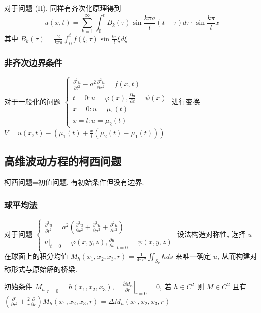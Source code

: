 \documentclass[10pt]{yerbaformat}
\begin{document}
\par 对于问题 (II), 同样有齐次化原理得到
$$
    u(x, t)=\sum_{k=1}^{\infty} \int_{0}^{t} B_{k}(\tau) \sin \frac{k \pi a}{l}(t-\tau) d \tau \cdot \sin \frac{k \pi}{l} x
$$
其中 $B_{k}(\tau)=\frac{2}{k \pi a} \int_{0}^{t} f(\xi, \tau) \sin \frac{k \pi}{l} \xi d \xi$

\subsubsection{非齐次边界条件}
\par 对于一般化的问题 $\left\{\begin{array}{l}\frac{\partial^{2} u}{\partial t^{2}}-a^{2} \frac{\partial^{2} u}{\partial x^{2}}=f(x, t) \\ t=0: u=\varphi(x), \frac{\partial u}{\partial t}=\psi(x) \\ x=0: u=\mu_{1}(t) \\ x=l: u=\mu_{2}(t)\end{array}\right.$ 进行变换 $V=u(x,t)-(\mu_{1}(t)+\frac{x}{l}\left(\mu_{2}(t)-\mu_{1}(t)\right))$

\subsection{高维波动方程的柯西问题}

\par 柯西问题=初值问题, 有初始条件但没有边界.

\subsubsection{球平均法}
\par 对于问题 $\left\{\begin{array}{l}\frac{\partial^{2} u}{\partial t^{2}}=a^{2}\left(\frac{\partial^{2} u}{\partial x^{2}}+\frac{\partial^{2} u}{\partial y^{2}}+\frac{\partial^{2} u}{\partial z^{2}}\right) \\ \left.u\right|_{t=0}=\varphi(x, y, z),\left.\frac{\partial u}{\partial t}\right|_{t=0}=\psi(x, y, z)\end{array}\right.$ 设法构造对称性, 选择 $u$ 在球面上的积分均值 $M_{h}\left(x_{1}, x_{2}, x_{3}, r\right)=\frac{1}{4 \pi r^{2}} \iint_{S_{r}} h ds$ 来唯一确定 $u$, 从而构建对称形式与原始解的桥梁.

\begin{lemma}
    初始条件 $\left.M_{h}\right|_{r=0}=h\left(x_{1}, x_{2}, x_{3}\right),\left.\quad \frac{\partial M_{h}}{\partial r}\right|_{r=0}=0$, 若 $h \in C^2$ 则 $M \in C^2$ 且有 $\left(\frac{\partial^{2}}{\partial r^{2}}+\frac{2}{r} \frac{\partial}{\partial r}\right) M_{h}\left(x_{1}, x_{2}, x_{3}, r\right)=\Delta M_{h}\left(x_{1}, x_{2}, x_{3}, r\right)$
\end{lemma}
\end{document}
